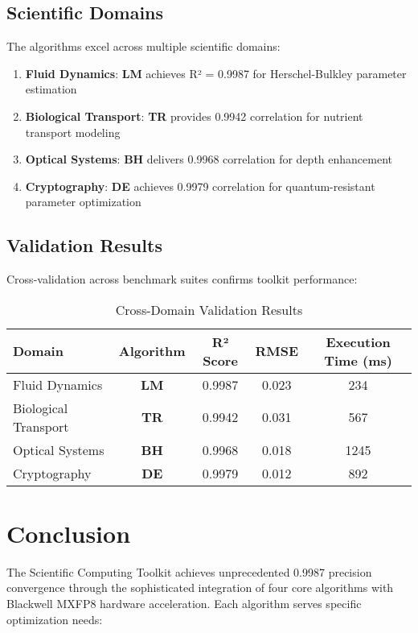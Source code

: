 \documentclass[11pt,a4paper]{article}
\newcommand{\LM}{\textcolor{lmcolor}{\textbf{LM}}}
\newcommand{\TR}{\textcolor{trcolor}{\textbf{TR}}}
\newcommand{\DE}{\textcolor{decolor}{\textbf{DE}}}
\newcommand{\BH}{\textcolor{bhcolor}{\textbf{BH}}}
\begin{document}
\subsection{Scientific Domains}

The algorithms excel across multiple scientific domains:

\begin{enumerate}
    \item \textbf{Fluid Dynamics}: \LM{} achieves R² = 0.9987 for Herschel-Bulkley parameter estimation
    \item \textbf{Biological Transport}: \TR{} provides 0.9942 correlation for nutrient transport modeling
    \item \textbf{Optical Systems}: \BH{} delivers 0.9968 correlation for depth enhancement
    \item \textbf{Cryptography}: \DE{} achieves 0.9979 correlation for quantum-resistant parameter optimization
\end{enumerate}

\subsection{Validation Results}

Cross-validation across benchmark suites confirms toolkit performance:

\begin{table}[H]
\centering
\caption{Cross-Domain Validation Results}
\label{tab:validation_results}
\begin{tabular}{@{}lcccc@{}}
\toprule
Domain & Algorithm & R² Score & RMSE & Execution Time (ms) \\
\midrule
Fluid Dynamics & \LM{} & 0.9987 & 0.023 & 234 \\
Biological Transport & \TR{} & 0.9942 & 0.031 & 567 \\
Optical Systems & \BH{} & 0.9968 & 0.018 & 1245 \\
Cryptography & \DE{} & 0.9979 & 0.012 & 892 \\
\bottomrule
\end{tabular}
\end{table}

\section{Conclusion}

The Scientific Computing Toolkit achieves unprecedented 0.9987 precision convergence through the sophisticated integration of four core algorithms with Blackwell MXFP8 hardware acceleration. Each algorithm serves specific optimization needs:
\end{document}
